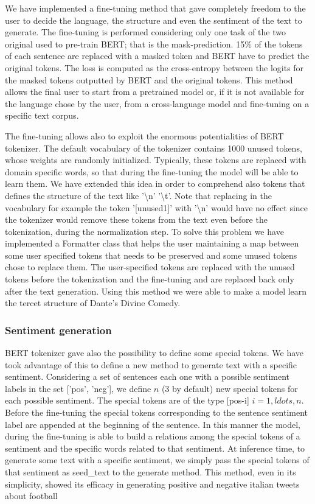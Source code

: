 \documentclass[10pt,twocolumn,letterpaper]{article}
\begin{document}
We have implemented a fine-tuning method that gave completely freedom to the user to decide the language,
the structure and even the sentiment of the text to generate.
The fine-tuning is performed considering only one task of the
two original used to pre-train BERT; that is the mask-prediction.
15\% of the tokens of each sentence are replaced with a masked token and
BERT have to predict the original tokens.
The loss is computed as the cross-entropy between the logits for the
masked tokens outputted by BERT and the original tokens.
This method allows the final user to start from a pretrained model or, if
it is not available for the language chose by the user, from a cross-language model
and fine-tuning on a specific text corpus.

The fine-tuning allows also to exploit the enormous potentialities of BERT tokenizer.
The default vocabulary of the tokenizer contains 1000 unused tokens,
whose weights are randomly initialized.
Typically, these tokens are replaced with domain specific words,
so that during the fine-tuning the model will be able to learn them.
We have extended this idea in order to comprehend also tokens that defines
the structure of the text like '\textbackslash n' '\textbackslash t'.
Note that replacing in the vocabulary for example the token '[unused1]'
with '\textbackslash n' would have no effect since the tokenizer would
remove these tokens from the text even before the tokenization,
during the normalization step.
To solve this problem we have implemented a Formatter class that helps
the user maintaining a map between some user specified tokens that needs
to be preserved and some unused tokens chose to replace them.
The user-specified tokens are replaced with the unused tokens before
the tokenization and the fine-tuning and are replaced back only after the
text generation.
Using this method we were able to make a model learn the tercet structure
of Dante's Divine Comedy.

\subsubsection{Sentiment generation}
BERT tokenizer gave also the possibility to define some special tokens.
We have took advantage of this to define a new method to generate text
with a specific sentiment.
Considering a set of sentences each one with a possible sentiment labels
in the set ['pos', 'neg'], we define $n$ (3 by default) new special tokens
for each possible sentiment.
The special tokens are of the type [pos-i] $i=1,ldots,n$.
Before the fine-tuning the special tokens corresponding to the sentence
sentiment label are appended at the beginning of the sentence.
In this manner the model, during the fine-tuning is able to build a
relations among the special tokens of a sentiment and the specific words
related to that sentiment.
At inference time, to generate some text with a specific sentiment,
we simply pass the special tokens of that sentiment as seed\_text to the
generate method.
This method, even in its simplicity, showed its efficacy in generating positive
and negative italian tweets about football
\end{document}
